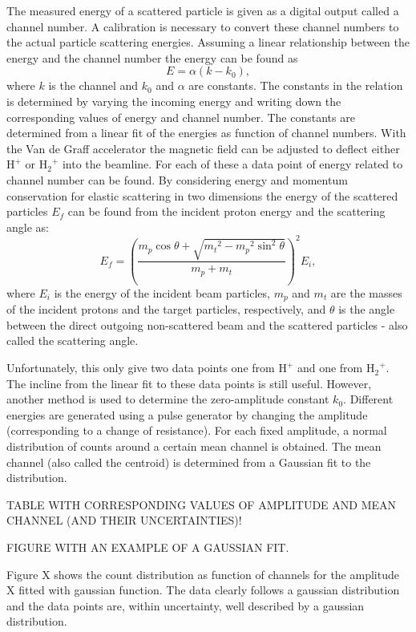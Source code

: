 The measured energy of a scattered particle is given as a digital output called a channel number. A calibration is necessary to convert these channel numbers to the actual particle scattering energies. Assuming a linear relationship between the energy and the channel number the energy can be found as 
\begin{equation}
E = \alpha(k - k_0),
\end{equation}
where $k$ is the channel and $k_0$ and $\alpha$ are constants. The constants in the relation is determined by varying the incoming energy and writing down the corresponding values of energy and channel number. The constants are determined from a linear fit of the energies as function of channel numbers.
With the Van de Graff accelerator the magnetic field can be adjusted to deflect either $\mathrm{H^+}$ or $\mathrm{{H_2}^+}$ into the beamline. For each of these a data point of energy related to channel number can be found. 
By considering energy and momentum conservation for elastic scattering in two dimensions the energy of the scattered particles $E_f$ can be found from the incident proton energy and the scattering angle as: 
\begin{equation}
E_f = \left( \frac{m_p \cos\theta + \sqrt{{m_t}^2 - {m_p}^2 \sin^2\theta}}{m_p+m_t} \right)^2 E_i,
\end{equation}
where $E_i$ is the energy of the incident beam particles, $m_p$ and $m_t$ are the masses of the incident protons and the target particles, respectively, and $\theta$ is the angle between the direct outgoing non-scattered beam and the scattered particles - also called the scattering angle.

Unfortunately, this only give two data points one from $\mathrm{H^+}$ and one from $\mathrm{{H_2}^+}$. The incline from the linear fit to these data points is still useful. However, another method is used to determine the zero-amplitude constant $k_0$. Different energies are generated using a pulse generator by changing the amplitude (corresponding to a change of resistance). For each fixed amplitude, a normal distribution of counts around a certain mean channel is obtained. The mean channel (also called the centroid) is determined from a Gaussian fit to the distribution. 

TABLE WITH CORRESPONDING VALUES OF AMPLITUDE AND MEAN CHANNEL (AND THEIR UNCERTAINTIES)!

FIGURE WITH AN EXAMPLE OF A GAUSSIAN FIT.

Figure X shows the count distribution as function of channels for the amplitude X fitted with gaussian function. The data clearly follows a gaussian distribution and the data points are, within uncertainty, well described by a gaussian distribution. 

